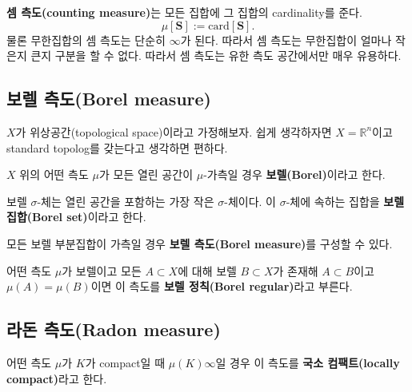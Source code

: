 \documentclass[b5paper,]{scrbook}
\theoremstyle{plain}
\theoremstyle{definition}
\numberwithin{equation}{section}
\let\BeginKnitrBlock\begin \let\EndKnitrBlock\end
\begin{document}
\textbf{셈 측도(counting measure)}는 모든 집합에 그 집합의 cardinality를 준다.
\[\mu[\mathbf{S}]:=\text{card}[\mathbf{S}].\]
물론 무한집합의 셈 측도는 단순히 \(\infty\)가 된다. 따라서 셈 측도는 무한집합이 얼마나 작은지 큰지 구분을 할 수 없다. 따라서 셈 측도는 유한 측도 공간에서만 매우 유용하다.

\hypertarget{-borel-measure}{%
\subsection{보렐 측도(Borel measure)}\label{-borel-measure}}

\(X\)가 위상공간(topological space)이라고 가정해보자. 쉽게 생각하자면 \(X=\mathbb{R}^{n}\)이고 standard topolog를 갖는다고 생각하면 편하다.

\BeginKnitrBlock{definition}[측도가 보렐]
\protect\hypertarget{def:unnamed-chunk-57}{}{\label{def:unnamed-chunk-57} {} }\(X\) 위의 어떤 측도 \(\mu\)가 모든 열린 공간이 \(\mu\)-가측일 경우 \textbf{보렐(Borel)}이라고 한다.
\EndKnitrBlock{definition}

보렐 \(\sigma\)-체는 열린 공간을 포함하는 가장 작은 \(\sigma\)-체이다. 이 \(\sigma\)-체에 속하는 집합을 \textbf{보렐 집합(Borel set)}이라고 한다.

\BeginKnitrBlock{definition}[보렐 측도]
\protect\hypertarget{def:unnamed-chunk-58}{}{\label{def:unnamed-chunk-58} {} }모든 보렐 부분집합이 가측일 경우 \textbf{보렐 측도(Borel measure)}를 구성할 수 있다.
\EndKnitrBlock{definition}

\BeginKnitrBlock{definition}[보렐 정칙]
\protect\hypertarget{def:unnamed-chunk-59}{}{\label{def:unnamed-chunk-59} {} }어떤 측도 \(\mu\)가 보렐이고 모든 \(A\subset X\)에 대해 보렐 \(B\subset X\)가 존재해 \(A\subset B\)이고 \(\mu(A)=\mu(B)\)이면 이 측도를 \textbf{보렐 정칙(Borel regular)}라고 부른다.
\EndKnitrBlock{definition}

\hypertarget{-radon-measure}{%
\subsection{라돈 측도(Radon measure)}\label{-radon-measure}}

\BeginKnitrBlock{definition}[국소 컴팩트]
\protect\hypertarget{def:unnamed-chunk-60}{}{\label{def:unnamed-chunk-60} {} }어떤 측도 \(\mu\)가 \(K\)가 compact일 때 \(\mu(K)\infty\)일 경우 이 측도를 \textbf{국소 컴팩트(locally compact)}라고 한다.
\EndKnitrBlock{definition}
\end{document}
